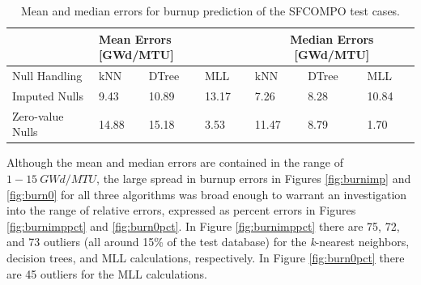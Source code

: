\begin{table}[!htb]
  \centering
  \begin{tabular}{@{}m{1.5in}llllll@{}}
    \toprule
                     & \multicolumn{3}{m{2in}}{Mean Errors [GWd/MTU]} & \multicolumn{3}{c}{Median Errors [GWd/MTU]} \\ \toprule
    Null Handling    & kNN           & DTree         & MLL           & kNN            & DTree          & MLL    \\ \midrule
    Imputed Nulls    & 9.43          & 10.89         & 13.17         & 7.26           & 8.28           & 10.84  \\
    Zero-value Nulls & 14.88         & 15.18         & 3.53          & 11.47          & 8.79           & 1.70   \\ \bottomrule
  \end{tabular}
  \caption{Mean and median errors for burnup prediction of the \gls{SFCOMPO} 
           test cases.}
  \label{tbl:sfcoburn}
\end{table}

Although the mean and median errors are contained in the range of $1-15\:
GWd/MTU$, the large spread in burnup errors in Figures \ref{fig:burnimp} and
\ref{fig:burn0} for all three algorithms was broad enough to warrant an
investigation into the range of relative errors, expressed as percent errors in
Figures \ref{fig:burnimppct} and \ref{fig:burn0pct}.  In Figure
\ref{fig:burnimppct} there are 75, 72, and 73 outliers (all around 15\% of the
test database) for the \textit{k}-nearest neighbors, decision trees, and
\gls{MLL} calculations, respectively.  In Figure \ref{fig:burn0pct} there are
45 outliers for the \gls{MLL} calculations.

